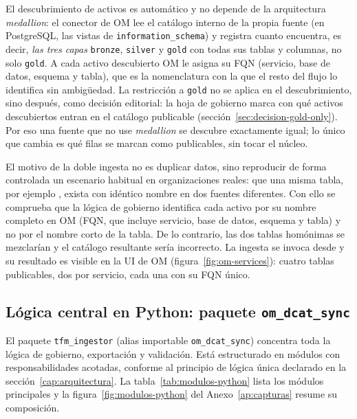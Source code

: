 El descubrimiento de activos es automático y no depende de la arquitectura \emph{medallion}: el conector de \ac{OM} lee el catálogo interno de la propia fuente (en PostgreSQL, las vistas de \texttt{information\_schema}) y registra cuanto encuentra, es decir, \emph{las tres capas} \texttt{bronze}, \texttt{silver} y \texttt{gold} con todas sus tablas y columnas, no solo \texttt{gold}. A cada activo descubierto \ac{OM} le asigna su \ac{FQN} (servicio, base de datos, esquema y tabla), que es la nomenclatura con la que el resto del flujo lo identifica sin ambigüedad. La restricción a \texttt{gold} no se aplica en el descubrimiento, sino después, como decisión editorial: la hoja de gobierno marca con  qué activos descubiertos entran en el catálogo publicable (sección~\ref{sec:decision-gold-only}). Por eso una fuente que no use \emph{medallion} se descubre exactamente igual; lo único que cambia es qué filas se marcan como publicables, sin tocar el núcleo.

El motivo de la doble ingesta no es duplicar datos, sino reproducir de forma controlada un escenario habitual en organizaciones reales: que una misma tabla, por ejemplo , exista con idéntico nombre en dos fuentes diferentes. Con ello se comprueba que la lógica de gobierno identifica cada activo por su nombre completo en \ac{OM} (\ac{FQN}, que incluye servicio, base de datos, esquema y tabla) y no por el nombre corto de la tabla. De lo contrario, las dos tablas homónimas se mezclarían y el catálogo resultante sería incorrecto. La ingesta se invoca desde  y su resultado es visible en la \ac{UI} de \ac{OM} (figura~\ref{fig:om-services}): cuatro tablas publicables, dos por servicio, cada una con su \ac{FQN} único.

\subsection{Lógica central en Python: paquete \texttt{om\_dcat\_sync}}\label{sec:implementacion-nucleo}

El paquete \texttt{tfm\_ingestor} (alias importable \texttt{om\_dcat\_sync}) concentra toda la lógica de gobierno, exportación y validación. Está estructurado en módulos con responsabilidades acotadas, conforme al principio de lógica única declarado en la sección~\ref{cap:arquitectura}. La tabla~\ref{tab:modulos-python} lista los módulos principales y la figura~\ref{fig:modulos-python} del Anexo~\ref{ap:capturas} resume su composición.

